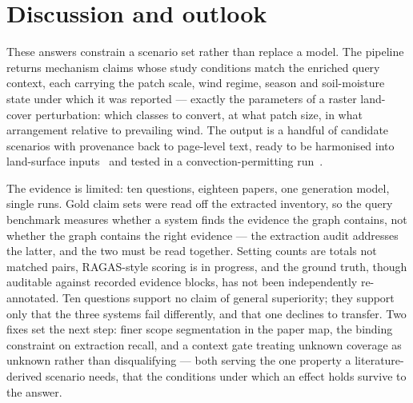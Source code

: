\documentclass{article}
\begin{document}
\section{Discussion and outlook}

These answers constrain a scenario set rather than replace a model. The pipeline returns
mechanism claims whose study conditions match the enriched query context, each carrying
the patch scale, wind regime, season and soil-moisture state under which it was reported
--- exactly the parameters of a raster land-cover perturbation: which classes to convert,
at what patch size, in what arrangement relative to prevailing wind. The output is a
handful of candidate scenarios with provenance back to page-level
text, ready to be harmonised into land-surface inputs~\citep{hurtt2020luh2} and tested in
a convection-permitting run~\citep{skamarock2019wrf}.

The evidence is limited: ten questions, eighteen papers, one generation model, single
runs. Gold claim sets were read off the extracted inventory, so the query benchmark
measures whether a system finds the evidence the graph contains, not whether the graph
contains the right evidence --- the extraction audit addresses the latter, and the two
must be read together. Setting counts are totals not matched pairs, RAGAS-style
scoring is in progress, and the ground truth, though auditable against recorded
evidence blocks, has not been independently re-annotated. Ten questions support no claim
of general superiority; they support only that the three
systems fail differently, and that one declines to transfer. Two fixes set the next
step: finer scope segmentation in the paper map, the binding constraint on extraction
recall, and a context gate treating unknown coverage as unknown rather than
disqualifying --- both serving the one property a literature-derived scenario needs,
that the conditions under which an effect holds survive to the answer.



\appendix

\end{document}
